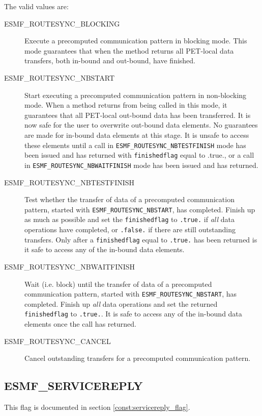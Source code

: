 The valid values are:
\begin{description}

\item [ESMF\_ROUTESYNC\_BLOCKING]
         Execute a precomputed communication pattern in blocking mode. This
         mode guarantees that when the method returns all PET-local data
         transfers, both in-bound and out-bound, have finished. 
\item [ESMF\_ROUTESYNC\_NBSTART]
         \begin{sloppypar}
         Start executing a precomputed communication pattern in non-blocking
         mode. When a method returns from being called in this mode, it
         guarantees that all PET-local out-bound data has been transferred.
         It is now safe for the user to overwrite out-bound data elements.
         No guarantees are made for in-bound data elements at this stage. It is
         unsafe to access these elements until a call in
         {\tt ESMF\_ROUTESYNC\_NBTESTFINISH} mode has been issued and has returned
         with {\tt finishedflag} equal to .true., or a call in
         {\tt ESMF\_ROUTESYNC\_NBWAITFINISH} mode has been issued and has returned.
         \end{sloppypar}
\item [ESMF\_ROUTESYNC\_NBTESTFINISH]
         Test whether the transfer of data of a precomputed communication
         pattern, started with {\tt ESMF\_ROUTESYNC\_NBSTART}, has completed.
         Finish up as much as possible and set the {\tt finishedflag} to 
         {\tt .true.} if {\em all} data operations have completed, or
         {\tt .false.} if there are still outstanding transfers. Only after
         a {\tt finishedflag} equal to {\tt .true.} has been returned is it
         safe to access any of the in-bound data elements.
\item [ESMF\_ROUTESYNC\_NBWAITFINISH]
         Wait (i.e. block) until the transfer of data of a precomputed
         communication pattern, started with {\tt ESMF\_ROUTESYNC\_NBSTART}, has
         completed. Finish up {\em all} data operations and set the returned 
         {\tt finishedflag} to {\tt .true.}. It is safe to access any of the
         in-bound data elements once the call has returned.
\item [ESMF\_ROUTESYNC\_CANCEL]
         Cancel outstanding transfers for a precomputed communication pattern.
\end{description}

\subsection{ESMF\_SERVICEREPLY}
This flag is documented in section \ref{const:servicereply_flag}.

